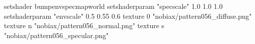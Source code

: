 setshader bumpenvspecmapworld
setshaderparam "specscale" 1.0 1.0 1.0
setshaderparam "envscale"  0.5 0.55 0.6
   texture 0 "nobiax/pattern056_diffuse.png"
   texture n "nobiax/pattern056_normal.png"
   texture s "nobiax/pattern056_specular.png"